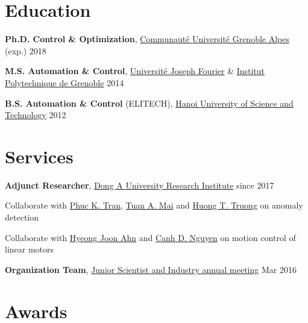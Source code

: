\documentclass[a4paper,11pt]{article}
\begin{document}
 \section{Education}

\textbf{Ph.D. Control \& Optimization},
\href{https://www.communaute-univ-grenoble-alpes.fr/}{Communaut\'{e} Universit\'{e} Grenoble Alpes}
\hfill {(exp.) 2018}

\vspace{0.1cm}

\textbf{M.S. Automation \& Control},
\href{https://www.univ-grenoble-alpes.fr/}{Universit\'{e} Joseph Fourier} \& \href{http://www.grenoble-inp.fr/}{Institut Polytechnique de Grenoble}
\hfill {2014}

\vspace{0.1cm}

\textbf{B.S. Automation \& Control} (ELITECH),
\href{https://www.hust.edu.vn}{Hanoi University of Science and Technology}
\hfill {2012}

\section{Services}

\textbf{Adjunct Researcher}, 
\href{https://donga.edu.vn/english}{Dong A University Research Institute}
\hfill {since 2017}
\begin{innerlist}
\item Collaborate with \href{https://scholar.google.fr/citations?user=uGv7zzQAAAAJ&hl=en}{Phuc K. Tran}, \href{https://www.researchgate.net/profile/Anh_Tuan_Mai}{Tuan A. Mai} and \href{https://scholar.google.com/citations?user=y7XjYaQAAAAJ&hl=en}{Huong T. Truong} on anomaly detection
\item Collaborate with \href{https://www.researchgate.net/profile/Hyeong_Joon_Ahn}{Hyeong Joon Ahn} and \href{https://www.researchgate.net/profile/Nguyen_Duc_Canh}{Canh D. Nguyen} on motion control of linear motors
\end{innerlist}

\vspace{0.1cm}

\textbf{Organization Team}, 
\href{http://www.jsiam.giant-grenoble.org}{Junior Scientist and Industry annual meeting}
\hfill {Mar 2016}

\section{Awards}
\end{document}
